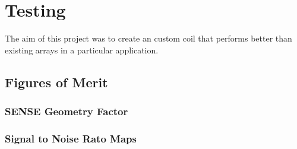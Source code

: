 \chapter{Testing}
The aim of this project was to create an custom coil that performs better than existing arrays in a particular
application. 

\cite{Pruessmann1999}
\section{Figures of Merit}
\subsection{SENSE Geometry Factor}
\subsection{Signal to Noise Rato Maps}

